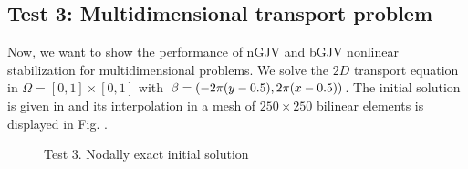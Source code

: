
\subsection{Test 3: Multidimensional transport problem} 
Now, we want to show the performance of nGJV and bGJV nonlinear stabilization for multidimensional problems. We solve the $2D$ transport equation  in $\Omega = [0,1]\times[0,1]$ with $\beta=(-2\pi (y-0.5), 2\pi (x-0.5))$. The initial solution is given in \cite{dmitri_kuzmin_guide_2010} and its interpolation in a mesh of $250\times250$ bilinear elements is displayed in Fig. . %
 

\begin{figure}%
\centering
{}%
\caption{Test 3. Nodally exact initial solution}\label{fig-algo}
\end{figure}


